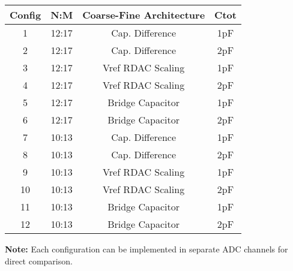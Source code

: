 \documentclass{article}
\begin{document}
\begin{table}[h!]
\centering
\begin{tabular}{cccc}
\toprule
Config & N:M & Coarse-Fine Architecture & Ctot \\
\midrule
1 & 12:17 & Cap. Difference & 1pF \\
2 & 12:17 & Cap. Difference & 2pF \\
3 & 12:17 & Vref RDAC Scaling & 1pF \\
4 & 12:17 & Vref RDAC Scaling & 2pF \\
5 & 12:17 & Bridge Capacitor & 1pF \\
6 & 12:17 & Bridge Capacitor & 2pF \\
7 & 10:13 & Cap. Difference & 1pF \\
8 & 10:13 & Cap. Difference & 2pF \\
9 & 10:13 & Vref RDAC Scaling & 1pF \\
10 & 10:13 & Vref RDAC Scaling & 2pF \\
11 & 10:13 & Bridge Capacitor & 1pF \\
12 & 10:13 & Bridge Capacitor & 2pF \\
\bottomrule
\end{tabular}
\end{table}

\textbf{Note:} Each configuration can be implemented in separate ADC
channels for direct comparison.
\end{document}
